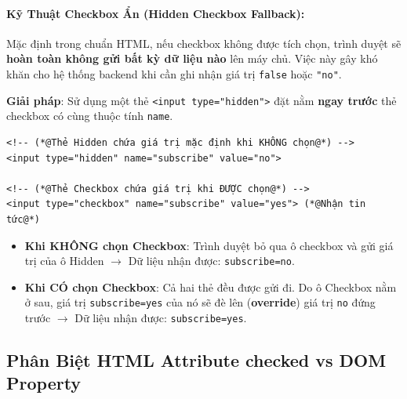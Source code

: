 \documentclass[11pt,oneside]{book}
\newcommand{\codeinline}[1]{\textcolor{accentOrange}{\texttt{#1}}}
\newcommand{\term}[1]{\textbf{\textcolor{primaryBlue}{#1}}}
\begin{document}
\paragraph{Kỹ Thuật Checkbox Ẩn (Hidden Checkbox Fallback):}
Mặc định trong chuẩn HTML, nếu checkbox không được tích chọn, trình duyệt sẽ \textbf{hoàn toàn không gửi bất kỳ dữ liệu nào} lên máy chủ. Việc này gây khó khăn cho hệ thống backend khi cần ghi nhận giá trị \codeinline{false} hoặc \codeinline{"no"}.

\textbf{Giải pháp}: Sử dụng một thẻ \codeinline{<input type="hidden">} đặt nằm \textbf{ngay trước} thẻ checkbox có cùng thuộc tính \codeinline{name}.

\begin{codeWindow}
\begin{lstlisting}[language=HTML5]
<!-- (*@Thẻ Hidden chứa giá trị mặc định khi KHÔNG chọn@*) -->
<input type="hidden" name="subscribe" value="no">

<!-- (*@Thẻ Checkbox chứa giá trị khi ĐƯỢC chọn@*) -->
<input type="checkbox" name="subscribe" value="yes"> (*@Nhận tin tức@*)
\end{lstlisting}
\end{codeWindow}

\begin{conceptBox}
\begin{itemize}[leftmargin=1.5em, itemsep=2pt, parsep=0pt]
    \item \textbf{Khi KHÔNG chọn Checkbox}: Trình duyệt bỏ qua ô checkbox và gửi giá trị của ô Hidden $\rightarrow$ Dữ liệu nhận được: \codeinline{subscribe=no}.
    \item \textbf{Khi CÓ chọn Checkbox}: Cả hai thẻ đều được gửi đi. Do ô Checkbox nằm ở sau, giá trị \codeinline{subscribe=yes} của nó sẽ đè lên (\term{override}) giá trị \codeinline{no} đứng trước $\rightarrow$ Dữ liệu nhận được: \codeinline{subscribe=yes}.
\end{itemize}
\end{conceptBox}

\subsection{Phân Biệt HTML Attribute checked vs DOM Property}
\end{document}
